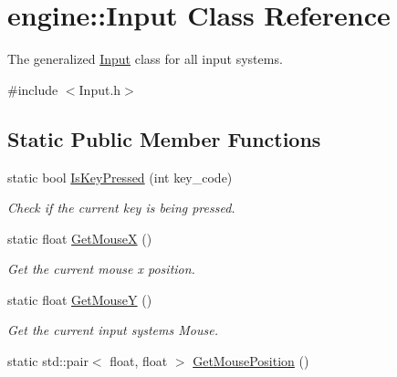 \hypertarget{classengine_1_1Input}{}\section{engine\+:\+:Input Class Reference}
\label{classengine_1_1Input}


The generalized \hyperlink{classengine_1_1Input}{Input} class for all input systems.  




{\ttfamily \#include $<$Input.\+h$>$}

\subsection*{Static Public Member Functions}
\begin{DoxyCompactItemize}
\item 
\mbox{\label{classengine_1_1Input_a79ec265ab6800cb0b1f627bfdb3cfc28}} 
static bool \hyperlink{classengine_1_1Input_a79ec265ab6800cb0b1f627bfdb3cfc28}{Is\+Key\+Pressed} (int key\+\_\+code)
\begin{DoxyCompactList}\small\item\em Check if the current key is being pressed. \end{DoxyCompactList}\item 
\mbox{\label{classengine_1_1Input_a13095584400184088868e6ff9c9f0a5d}} 
static float \hyperlink{classengine_1_1Input_a13095584400184088868e6ff9c9f0a5d}{Get\+MouseX} ()
\begin{DoxyCompactList}\small\item\em Get the current mouse x position. \end{DoxyCompactList}\item 
\mbox{\label{classengine_1_1Input_aa6fa67ccfdb48ac903c927157f0809c2}} 
static float \hyperlink{classengine_1_1Input_aa6fa67ccfdb48ac903c927157f0809c2}{Get\+MouseY} ()
\begin{DoxyCompactList}\small\item\em Get the current input systems Mouse. \end{DoxyCompactList}\item 
\mbox{\label{classengine_1_1Input_a4a15d91ac4241fc6dc3584c051e1b50a}} 
static std\+::pair$<$ float, float $>$ \hyperlink{classengine_1_1Input_a4a15d91ac4241fc6dc3584c051e1b50a}{Get\+Mouse\+Position} ()

\end{DoxyCompactItemize}
